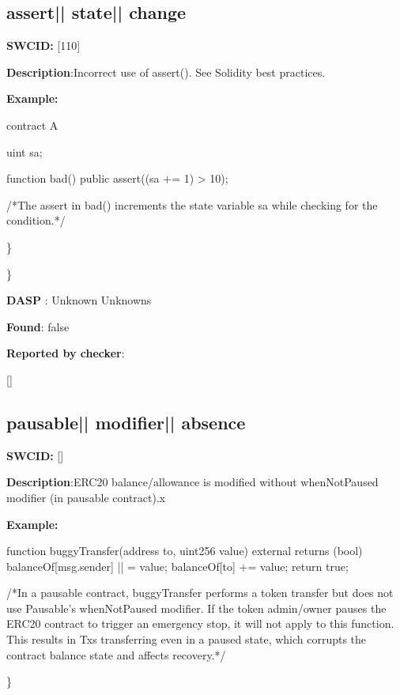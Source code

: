 \documentclass{article}
\begin{document}
\subsection{assert{|\textunderscore| }state{|\textunderscore| }change} 
\textbf{SWC{\textunderscore }ID:} [110]

\textbf{Description}:Incorrect use of assert(). See Solidity best practices.


\textbf{Example:} 
\begin{ffcode} 

contract A {
  uint s\textunderscore a;

  function bad() public {
    assert((s\textunderscore a += 1) > 10);
  }
}
 /*The assert in bad() increments the state variable s\textunderscore a while checking for the condition.*/ 

\end{ffcode} 
\} 

\} 

\textbf{DASP} : Unknown Unknowns

\textbf{Found}: false

\textbf{Reported by checker}: 
\begin{ffcode} 

[]
\end{ffcode} 
\subsection{pausable{|\textunderscore| }modifier{|\textunderscore| }absence} 
\textbf{SWC{\textunderscore }ID:} []

\textbf{Description}:ERC20 balance/allowance is modified without whenNotPaused modifier (in pausable contract).x


\textbf{Example:} 
\begin{ffcode} 

function buggyTransfer(address to, uint256 value) external returns (bool){
        balanceOf[msg.sender] |\textendash| = value;
        balanceOf[to] += value;
        return true;
    }

 /*In a pausable contract, buggyTransfer performs a token transfer but does not use Pausable's whenNotPaused modifier. If the token admin/owner pauses the ERC20 contract to trigger an emergency stop, it will not apply to this function. This results in Txs transferring even in a paused state, which corrupts the contract balance state and affects recovery.*/ 

\end{ffcode} 
\} 
\end{document}
